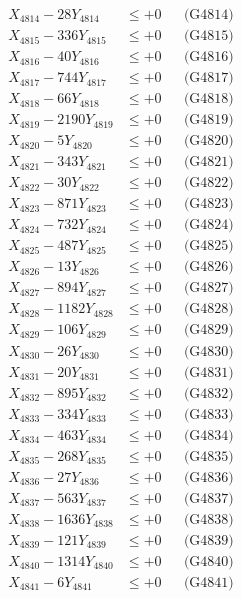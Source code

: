 \documentclass[a4paper,10pt]{article}
\begin{document}
{\begin{align}
X_{4814} - 28Y_{4814} &\leq +0 && \text{(G4814)} \\
X_{4815} - 336Y_{4815} &\leq +0 && \text{(G4815)} \\
X_{4816} - 40Y_{4816} &\leq +0 && \text{(G4816)} \\
X_{4817} - 744Y_{4817} &\leq +0 && \text{(G4817)} \\
X_{4818} - 66Y_{4818} &\leq +0 && \text{(G4818)} \\
X_{4819} - 2190Y_{4819} &\leq +0 && \text{(G4819)} \\
X_{4820} - 5Y_{4820} &\leq +0 && \text{(G4820)} \\
\allowbreak
X_{4821} - 343Y_{4821} &\leq +0 && \text{(G4821)} \\
X_{4822} - 30Y_{4822} &\leq +0 && \text{(G4822)} \\
X_{4823} - 871Y_{4823} &\leq +0 && \text{(G4823)} \\
X_{4824} - 732Y_{4824} &\leq +0 && \text{(G4824)} \\
X_{4825} - 487Y_{4825} &\leq +0 && \text{(G4825)} \\
X_{4826} - 13Y_{4826} &\leq +0 && \text{(G4826)} \\
X_{4827} - 894Y_{4827} &\leq +0 && \text{(G4827)} \\
X_{4828} - 1182Y_{4828} &\leq +0 && \text{(G4828)} \\
X_{4829} - 106Y_{4829} &\leq +0 && \text{(G4829)} \\
X_{4830} - 26Y_{4830} &\leq +0 && \text{(G4830)} \\
\allowbreak
X_{4831} - 20Y_{4831} &\leq +0 && \text{(G4831)} \\
X_{4832} - 895Y_{4832} &\leq +0 && \text{(G4832)} \\
X_{4833} - 334Y_{4833} &\leq +0 && \text{(G4833)} \\
X_{4834} - 463Y_{4834} &\leq +0 && \text{(G4834)} \\
X_{4835} - 268Y_{4835} &\leq +0 && \text{(G4835)} \\
X_{4836} - 27Y_{4836} &\leq +0 && \text{(G4836)} \\
X_{4837} - 563Y_{4837} &\leq +0 && \text{(G4837)} \\
X_{4838} - 1636Y_{4838} &\leq +0 && \text{(G4838)} \\
X_{4839} - 121Y_{4839} &\leq +0 && \text{(G4839)} \\
X_{4840} - 1314Y_{4840} &\leq +0 && \text{(G4840)} \\
\allowbreak
X_{4841} - 6Y_{4841} &\leq +0 && \text{(G4841)} \\

\end{align}}
\end{document}
